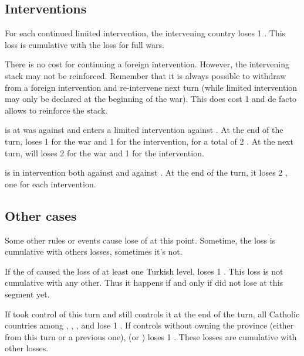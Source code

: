 \subsection{Interventions}
\bparag For each continued limited intervention, the intervening country loses
1 \STAB.
\bparag This loss is cumulative with the loss for full wars.

\bparag There is no cost for continuing a foreign intervention. However, the
intervening stack may not be reinforced.
\bparag Remember that it is always possible to withdraw from a foreign
intervention and re-intervene next turn (while limited intervention may only
be declared at the beginning of the war). This does cost 1 \STAB and de facto
allows to reinforce the stack.

\begin{exemple}[Interventions]
  \FRA is at was against \HIS and enters a limited intervention against
  \ANG. At the end of the turn, \FRA loses 1 \STAB for the war and 1 for the
  intervention, for a total of 2 \STAB. At the next turn, \FRA will loses
  2 \STAB for the war and 1 for the intervention.

  \ANG is in intervention both against \FRA and against \AUS. At the end of
  the turn, it loses 2 \STAB, one for each intervention.
\end{exemple}

\subsection{Other cases}
\aparag Some other rules or events cause lose of \STAB at this point.
\bparag Sometime, the loss is cumulative with others losses, sometimes it's
not. 

\bparag If the \corsaire of \paysChevaliers caused the loss of at least one
Turkish \TradeFLEET level, \TUR loses 1 \STAB.
\bparag This loss is not cumulative with any other. Thus it happens if and
only if \TUR did not lose \STAB at this segment yet.

\aparag[\villeVienne]
\bparag If \TUR took control of \villeVienne this turn and still controls it
at the end of the turn, all Catholic countries among \HIS, \AUS, \POL, \FRA
and \ANG lose 1 \STAB.
\bparag If \TUR controls \villeVienne without owning the province (either from
this turn or a previous one), \HAB (\SPA or \AUS) loses 1 \STAB.
\bparag These losses are cumulative with other losses.

